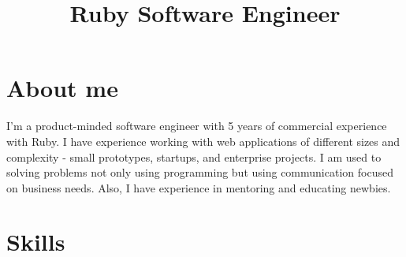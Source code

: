 \documentclass[11pt,a4paper]{moderncv}
\title{Ruby Software Engineer}
\begin{document}
\maketitle

\section{About me}
I'm a product-minded software engineer with 5 years of commercial experience with Ruby. I have experience working with web applications of different sizes and complexity - small prototypes, startups, and enterprise projects. I am used to solving problems not only using programming but using communication focused on business needs. Also, I have experience in mentoring and educating newbies.

\section{Skills}
\begin{cvcolumns}
\end{cvcolumns}
\end{document}
